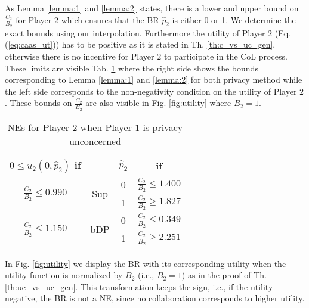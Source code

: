\documentclass[USenglish,oneside,twocolumn]{article}
\theoremstyle{plain}
\begin{document}
    As Lemma \ref{lemma:1} and \ref{lemma:2} states, there is a lower and upper bound on $\frac{C_2}{B_2}$ for Player $2$ which ensures that the BR $\hat{p}_2$ is either 0 or 1. We determine the exact bounds using our interpolation. Furthermore the utility of Player $2$ (Eq. (\ref{eq:caas_ut})) has to be positive as it is stated in Th. \ref{th:c_vs_uc_gen}, otherwise there is no incentive for Player $2$ to participate in the CoL process. These limits are visible Tab. \ref{tab:limit} where the right side shows the bounds corresponding to Lemma \ref{lemma:1} and \ref{lemma:2} for both privacy method while the left side corresponds to the non-negativity condition on the utility of Player $2$. These bounds on $\frac{C_2}{B_2}$ are also visible in Fig. \ref{fig:utility} where $B_2=1$.
    
    \vspace{-0.25cm}
    \begin{table}[h]
        \centering
        \begin{tabular}{|c||c||c|c|}
            \hline
            $0\leq u_2(0,\hat{p}_2)$ if & & $\hat{p}_2$ & if \\
            \hline
            \hline
            \multirow{2}{*}{$\frac{C_2}{B_2}\leq\num{0.990}$} & \multirow{2}{*}{Sup} & 0 & $\frac{C_2}{B_2}\leq\num{1.400}$ \\
            \cline{3-4}
            & & 1 & $\frac{C_2}{B_2}\geq\num{1.827}$ \\
            \hline
            \multirow{2}{*}{$\frac{C_2}{B_2}\leq\num{1.150}$} & \multirow{2}{*}{bDP} & 0 & $\frac{C_2}{B_2}\leq\num{0.349}$ \\
            \cline{3-4}
            & & 1 & $\frac{C_2}{B_2}\geq\num{2.251}$ \\
        \end{tabular}
        \vspace{0.1cm}
        \caption{NEs for Player $2$ when Player $1$ is privacy unconcerned}
        \label{tab:limit}
    \end{table}
    \vspace{-0.75cm}
    
    In Fig. \ref{fig:utility} we display the BR with its corresponding utility when the utility function is normalized by $B_2$ (i.e., $B_2=1$) as in the proof of Th. \ref{th:uc_vs_uc_gen}. This transformation keeps the sign, i.e., if the utility negative, the BR is not a NE, since no collaboration corresponds to higher utility. 
    
\end{document}
